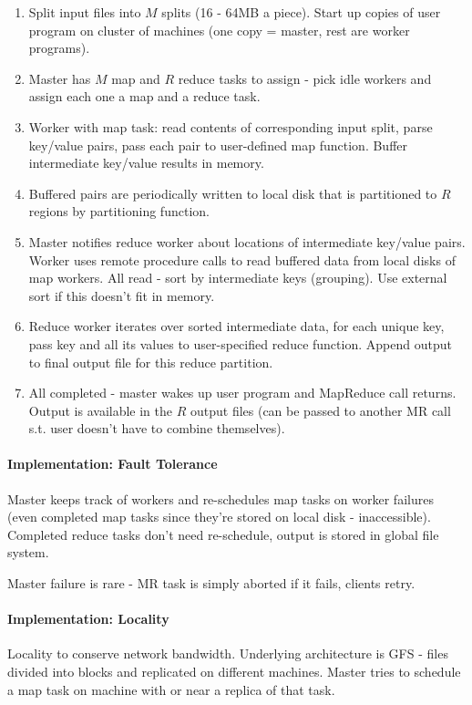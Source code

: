\begin{enumerate}
    \item Split input files into $M$ splits (16 - 64MB a piece). Start up copies of user program on cluster of machines (one copy = master, rest are worker programs).
    \item Master has $M$ map and $R$ reduce tasks to assign - pick idle workers and assign each one a map and a reduce task.
    \item Worker with map task: read contents of corresponding input split, parse key/value pairs, pass each pair to user-defined map function. Buffer intermediate key/value results in memory.
    \item Buffered pairs are periodically written to local disk that is partitioned to $R$ regions by partitioning function.
    \item Master notifies reduce worker about locations of intermediate key/value pairs. Worker uses remote procedure calls to read buffered data from local disks of map workers. All read - sort by intermediate keys (grouping). Use external sort if this doesn't fit in memory.
    \item Reduce worker iterates over sorted intermediate data, for each unique key, pass key and all its values to user-specified reduce function. Append output to final output file for this reduce partition.
    \item All completed - master wakes up user program and MapReduce call returns. Output is available in the $R$ output files (can be passed to another MR call s.t. user doesn't have to combine themselves).
\end{enumerate}

\paragraph{Implementation: Fault Tolerance}
Master keeps track of workers and re-schedules map tasks on worker failures (even completed map tasks since they're stored on local disk - inaccessible). Completed reduce tasks don't need re-schedule, output is stored in global file system.

Master failure is rare - MR task is simply aborted if it fails, clients retry.

\paragraph{Implementation: Locality}
Locality to conserve network bandwidth. Underlying architecture is GFS - files divided into blocks and replicated on different machines. Master tries to schedule a map task on machine with or near a replica of that task.


